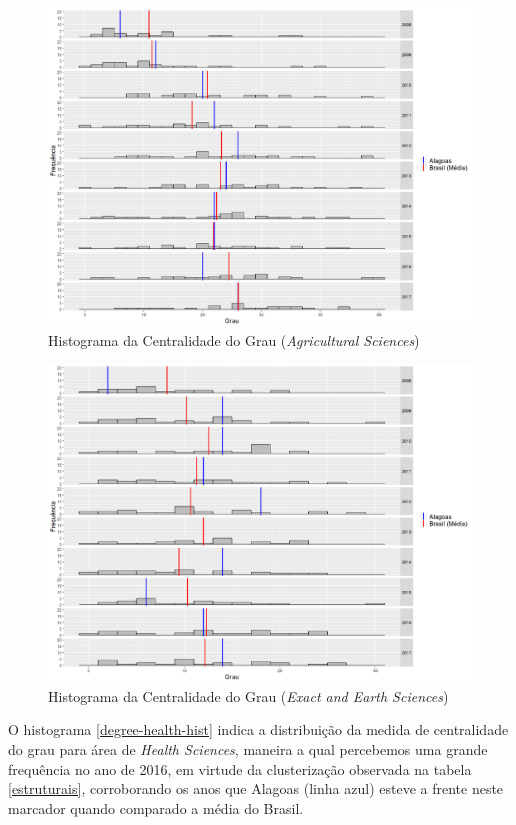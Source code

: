 \begin{figure}[H]
	\centering
	\includegraphics[scale=0.5]{Imagens/agricultural/degree-hist.pdf}
	\caption{Histograma da Centralidade do Grau (\textit{Agricultural Sciences})}
	\label{degree-agri-hist}
\end{figure}

\begin{figure}[H]
	\centering
	\includegraphics[scale=0.5]{Imagens/exact/degree-hist.pdf}
	\caption{Histograma da Centralidade do Grau (\textit{Exact and Earth Sciences})}
	\label{degree-exact-hist}
\end{figure}


O histograma \ref{degree-health-hist} indica a distribuição da medida de centralidade do grau para área de \textit{Health Sciences}, maneira a qual percebemos uma grande frequência no ano de 2016, em virtude da clusterização observada na tabela \ref{estruturais}, corroborando os anos que Alagoas (linha azul) esteve a frente neste marcador quando comparado a média do Brasil.

